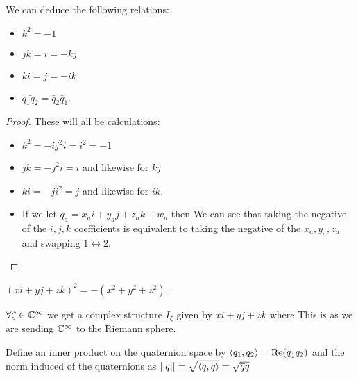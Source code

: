 \documentclass{article}
\begin{document}
\begin{lemma}
	We can deduce the following relations:
	\begin{itemize}
		\item $k^2=-1$
		\item $jk = i = -kj$
		\item $ki = j = -ik$
		\item $\bar{q_1 q_2} = \bar{q}_2 \bar{q}_1$. 
	\end{itemize}
\end{lemma}
\begin{proof}
	These will all be calculations:
	\begin{itemize}
		\item $k^2 = -ij^2i = i^2=-1$
		\item $jk = -j^2i = i$ and likewise for $kj$
		\item $ki = -ji^2 = j$ and likewise for $ik$.
		\item If we let $q_a = x_a i + y_a j + z_a k + w_a$ then 
We can see that taking the negative of the $i,j,k$ coefficients is equivalent to taking the negative of the $x_a,y_a,z_a$ and swapping $1 \leftrightarrow 2$. 
	\end{itemize}
\end{proof}
\begin{lemma}
	$(xi+yj+zk)^2 = -(x^2+y^2+z^2)$.
\end{lemma}
\begin{corollary}
	$\forall \zeta \in \mathbb{C}^\infty$ we get a complex structure $I_\zeta$ given by $xi+yj+zk$ where 
This is as we are sending $\mathbb{C}^\infty$ to the Riemann sphere. 
\end{corollary}

\begin{definition}
	Define an inner product on the quaternion space by $\left\langle q_1,q_2 \right\rangle = \operatorname{Re}(\overline{q}_1 q_2)$ and the norm induced of the quaternions as $\left\lvert\left\lvert q \right\rvert\right\rvert = \sqrt{\left\langle q,q \right\rangle}=\sqrt{\overline{q}q}$ 
\end{definition}
\end{document}
